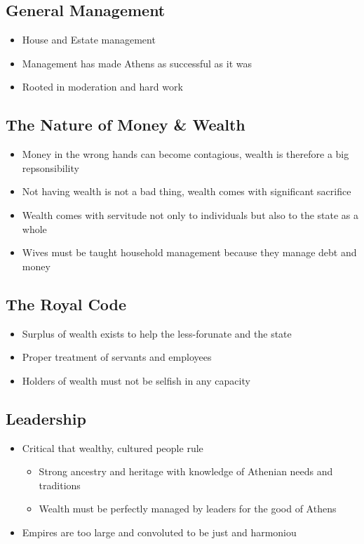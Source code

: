 \documentclass[11pt]{article}
\begin{document}
\subsection{General Management}
\label{sec:org761651f}
\begin{itemize}
\item House and Estate management
\item Management has made Athens as successful as it was
\item Rooted in moderation and hard work
\end{itemize}
\subsection{The Nature of Money \& Wealth}
\label{sec:orgcfba36c}
\begin{itemize}
\item Money in the wrong hands can become contagious, wealth is therefore a big repsonsibility
\item Not having wealth is not a bad thing, wealth comes with significant sacrifice
\item Wealth comes with servitude not only to individuals but also to the state as a whole
\item Wives must be taught household management because they manage debt and money
\end{itemize}
\subsection{The Royal Code}
\label{sec:org3eb4146}
\begin{itemize}
\item Surplus of wealth exists to help the less-forunate and the state
\item Proper treatment of servants and employees
\item Holders of wealth must not be selfish in any capacity
\end{itemize}
\subsection{Leadership}
\label{sec:org95c2065}
\begin{itemize}
\item Critical that wealthy, cultured people rule
\begin{itemize}
\item Strong ancestry and heritage with knowledge of Athenian needs and traditions
\item Wealth must be perfectly managed by leaders for the good of Athens
\end{itemize}
\item Empires are too large and convoluted to be just and harmoniou
\end{itemize}
\end{document}
